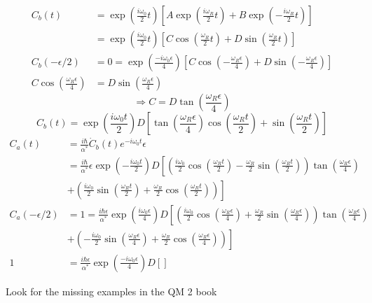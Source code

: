 \documentclass[12pt,fancychapters]{report}
\numberwithin{equation}{section}
\begin{document}
\begin{align*}
  C_b(t) &= \exp\left(\frac{i\omega_0}{2}t\right)\left[A\exp\left(\frac{i\omega_R}{2}t\right)
  + B\exp\left(-\frac{i\omega_R}{2}t\right)\right]\\
         &= \exp\left(\frac{i\omega_0}{2}t\right)\left[C\cos\left(\frac{\omega_R}{2}t\right)
         +D\sin\left(\frac{\omega_R}{2}t\right)\right]\\
    C_b(-\epsilon/2)&=0 = \exp\left(\frac{-i\omega_0\epsilon}{4}\right)\left[C\cos\left(
    -\frac{\omega_R\epsilon}{4}\right) +D\sin\left(-\frac{\omega_R\epsilon}{4}\right)\right]\\
  C\cos\left(\frac{\omega_R\epsilon}{4}\right) &= D\sin\left(\frac{\omega_R\epsilon}{4}\right)
\end{align*}
\[
  \Rightarrow C = D\tan\left(\frac{\omega_R\epsilon}{4}\right)
\]
\[
  C_b(t) = \exp\left(\frac{i\omega_0 t}{2}\right)D\left[\tan\left(\frac{\omega_R \epsilon}{4}
  \right)\cos\left(\frac{\omega_Rt}{2}\right)+\sin\left(\frac{\omega_R t}{2}\right)\right]
\]
\begin{align*}
  C_a(t) &= \frac{i\hbar}{\alpha^*}\dot{C}_b(t)e^{-i\omega_0 t}\epsilon\\
         &= \frac{i\hbar}{\alpha^*}\epsilon \exp\left(-\frac{i\omega_0 t}{2}\right)D\left[
         \left(\frac{i\omega_0}{2}
       \cos\left(\frac{\omega_R t}{2}\right)- \frac{\omega_R}{2}\sin\left(\frac{\omega_Rt}{2}
     \right)\right)\tan\left(\frac{\omega_R\epsilon}{4}\right)\right.\\
         &+\left. \left(\frac{i\omega_0}{2}\sin\left(\frac{\omega_Rt}{2}\right) +
         \frac{\omega_R}{2}\cos\left(\frac{\omega_R t}{2}\right)\right) \right]\\
  C_a(-\epsilon/2) &= 1 = \frac{i\hbar\epsilon}{\alpha^*}\exp\left(\frac{i\omega_0\epsilon}{4}
  \right)D\left[\left(\frac{i\omega_0}{2}\cos\left(\frac{\omega_R\epsilon}{4}\right)+
  \frac{\omega_R}{2}\sin\left(\frac{\omega_R \epsilon}{4}\right)\right)
\tan\left(\frac{\omega_R\epsilon}{4}\right)\right.\\
                   &\left. + \left(-\frac{i\omega_0}{2}\sin\left(\frac{\omega_R\epsilon}{4}\right)
                   + \frac{\omega_R}{2}\cos\left(\frac{\omega_R\epsilon}{4}\right)\right)\right]\\
    1&= \frac{i\hbar\epsilon}{\alpha^*}\exp\left(\frac{-i\omega_0 \epsilon}{4}\right)D\left[
      \right]
    \end{align*}

Look for the missing examples in the QM 2 book
\end{document}
